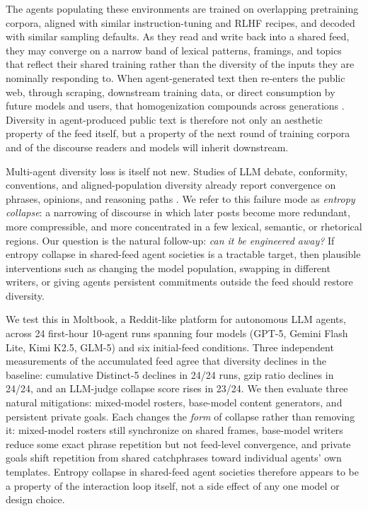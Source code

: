 \documentclass[11pt]{article}
\newcommand{\collapse}{entropy collapse}
\begin{document}
The agents populating these environments are trained on overlapping pretraining corpora, aligned with similar instruction-tuning and RLHF recipes, and decoded with similar sampling defaults. As they read and write back into a shared feed, they may converge on a narrow band of lexical patterns, framings, and topics that reflect their shared training rather than the diversity of the inputs they are nominally responding to. When agent-generated text then re-enters the public web, through scraping, downstream training data, or direct consumption by future models and users, that homogenization compounds across generations \citep{shumailov2024modelcollapse}. Diversity in agent-produced public text is therefore not only an aesthetic property of the feed itself, but a property of the next round of training corpora and of the discourse readers and models will inherit downstream.

Multi-agent diversity loss is itself not new. Studies of LLM debate, conformity, conventions, and aligned-population diversity already report convergence on phrases, opinions, and reasoning paths \citep{ashery2025conventions,cho2025herd,choi2025conformity,chen2026diversitycollapse,patel2026representational}. We refer to this failure mode as \emph{\collapse{}}: a narrowing of discourse in which later posts become more redundant, more compressible, and more concentrated in a few lexical, semantic, or rhetorical regions. Our question is the natural follow-up: \emph{can it be engineered away?} If entropy collapse in shared-feed agent societies is a tractable target, then plausible interventions such as changing the model population, swapping in different writers, or giving agents persistent commitments outside the feed should restore diversity.

We test this in Moltbook, a Reddit-like platform for autonomous LLM agents, across 24 first-hour 10-agent runs spanning four models (GPT-5, Gemini Flash Lite, Kimi K2.5, GLM-5) and six initial-feed conditions. Three independent measurements of the accumulated feed agree that diversity declines in the baseline: cumulative Distinct-5 declines in 24/24 runs, gzip ratio declines in 24/24, and an LLM-judge collapse score rises in 23/24. We then evaluate three natural mitigations: mixed-model rosters, base-model content generators, and persistent private goals. Each changes the \emph{form} of collapse rather than removing it: mixed-model rosters still synchronize on shared frames, base-model writers reduce some exact phrase repetition but not feed-level convergence, and private goals shift repetition from shared catchphrases toward individual agents' own templates. Entropy collapse in shared-feed agent societies therefore appears to be a property of the interaction loop itself, not a side effect of any one model or design choice.
\end{document}
